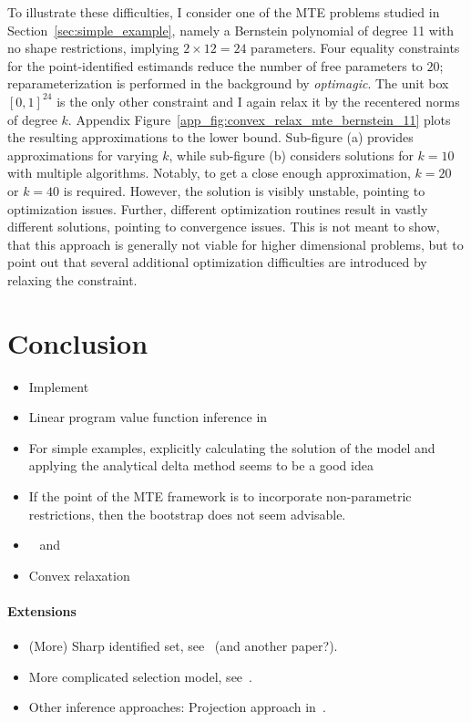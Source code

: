 \documentclass[12pt,a4paper,english]{article} %
\numberwithin{equation}{section}
\theoremstyle{definition}
\theoremstyle{remark}
\theoremstyle{plain}
\begin{document}
To illustrate these difficulties, I consider one of the MTE problems studied in Section~\ref{sec:simple_example}, namely a Bernstein polynomial of degree 11 with no shape restrictions, implying $2\times12=24$ parameters.
Four equality constraints for the point-identified estimands reduce the number of free parameters to $20$; reparameterization is performed in the background by \textit{optimagic}.
The unit box $[0,1]^{24}$ is the only other constraint and I again relax it by the recentered norms of degree $k$.
Appendix Figure~\ref{app_fig:convex_relax_mte_bernstein_11} plots the resulting approximations to the lower bound.
Sub-figure (a) provides approximations for varying $k$, while sub-figure (b) considers solutions for $k=10$ with multiple algorithms.
Notably, to get a close enough approximation, $k=20$ or $k=40$ is required. However, the solution is visibly unstable, pointing to optimization issues.
Further, different optimization routines result in vastly different solutions, pointing to convergence issues.
This is not meant to show, that this approach is generally not viable for higher dimensional problems, but to point out that several additional optimization difficulties are introduced by relaxing the constraint.


\section{Conclusion}

\begin{itemize}
  \item Implement~\cite{bei2023inference}
  \item Linear program value function inference in~\cite{}
  \item For simple examples, explicitly calculating the solution of the model and applying the analytical delta method seems to be a good idea
  \item If the point of the MTE framework is to incorporate non-parametric restrictions, then the bootstrap does not seem advisable.
  \item~\cite{bhattacharya2009inferring} and~\cite{freyberger2015identification}
  \item Convex relaxation
\end{itemize}


\paragraph{Extensions}
\begin{itemize}
  \item (More) Sharp identified set, see~\cite{marx2024sharp} (and another paper?).
  \item More complicated selection model, see~\cite{dutz2021selection}.
  \item Other inference approaches: Projection approach in~\cite{bei2023inference}.
\end{itemize}
\end{document}
